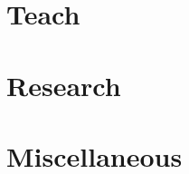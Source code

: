 \documentclass{article}
\begin{document}

\section{Teach}


\section{Research}


\section{Miscellaneous}


\printbibliography[heading=bibintoc]
	
\end{document}
